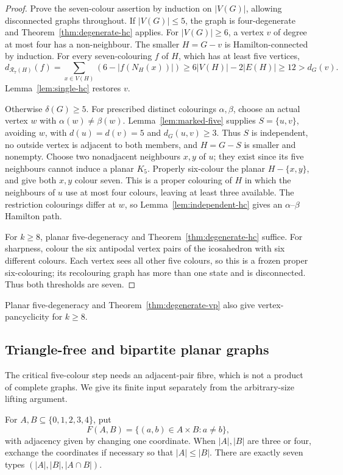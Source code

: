 \documentclass[11pt]{article}
\theoremstyle{remark}
\newcommand{\R}{\mathcal R}
\numberwithin{equation}{section}
\numberwithin{table}{section}
\begin{document}
\begin{proof}
Prove the seven-colour assertion by induction on $|V(G)|$, allowing
disconnected graphs throughout.  If $|V(G)|\le5$, the graph is
four-degenerate and Theorem~\ref{thm:degenerate-hc} applies.
For $|V(G)|\ge6$, a vertex $v$ of degree at most four has a
non-neighbour.  The smaller $H=G-v$ is Hamilton-connected by induction.
For every seven-colouring $f$ of $H$, which has at least five vertices,
\[
 d_{\R_7(H)}(f)
 =\sum_{x\in V(H)}(6-|f(N_H(x))|)
 \ge6|V(H)|-2|E(H)|\ge12>d_G(v).
\]
Lemma~\ref{lem:single-hc} restores $v$.

Otherwise $\delta(G)\ge5$.  For prescribed distinct colourings
$\alpha,\beta$, choose an actual vertex $w$ with
$\alpha(w)\ne\beta(w)$.  Lemma~\ref{lem:marked-five} supplies
$S=\{u,v\}$, avoiding $w$, with $d(u)=d(v)=5$ and
$d_G(u,v)\ge3$.  Thus $S$ is independent, no outside vertex is
adjacent to both members, and $H=G-S$ is smaller and nonempty.
Choose two nonadjacent neighbours $x,y$ of $u$; they exist since its
five neighbours cannot induce a planar $K_5$.  Properly six-colour the
planar $H-\{x,y\}$, and give both $x,y$ colour seven.  This is a
proper colouring of $H$ in which the neighbours of $u$ use at most
four colours, leaving at least three available.  The restriction
colourings differ at $w$, so Lemma~\ref{lem:independent-hc} gives
an $\alpha$--$\beta$ Hamilton path.

For $k\ge8$, planar five-degeneracy and
Theorem~\ref{thm:degenerate-hc} suffice.  For sharpness, colour the
six antipodal vertex pairs of the icosahedron with six different
colours.  Each vertex sees all other five colours, so this is a frozen
proper six-colouring; its recolouring graph has more than one state and
is disconnected.  Thus both thresholds are seven.
\end{proof}

Planar five-degeneracy and Theorem~\ref{thm:degenerate-vp} also give
vertex-pancyclicity for $k\ge8$.

\subsection{Triangle-free and bipartite planar graphs}

The critical five-colour step needs an adjacent-pair fibre, which is
not a product of complete graphs.  We give its finite input separately
from the arbitrary-size lifting argument.

For $A,B\subseteq\{0,1,2,3,4\}$, put
\[
 F(A,B)=\{(a,b)\in A\times B:a\ne b\},
\]
with adjacency given by changing one coordinate.  When $|A|,|B|$ are
three or four, exchange the coordinates if necessary so that
$|A|\le|B|$.  There are exactly seven types
$(|A|,|B|,|A\cap B|)$.
\end{document}
